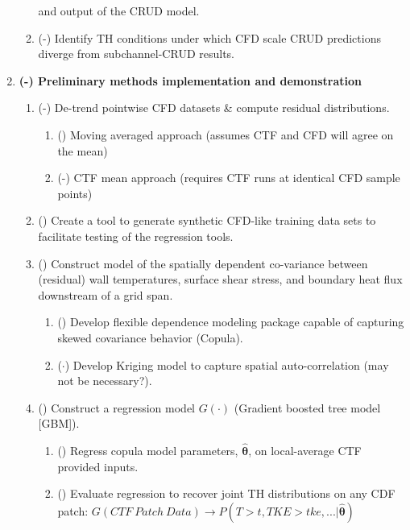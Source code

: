 \begin{enumerate}
\begin{enumerate}
              and output of the CRUD model.
          \item (\checkmark-) Identify TH conditions under which CFD scale CRUD predictions diverge from subchannel-CRUD results.
    \end{enumerate}
\item \textbf{(\checkmark-) Preliminary methods implementation and demonstration}
    \begin{enumerate}
        \item (\checkmark-) De-trend pointwise CFD datasets \& compute residual distributions.
        \begin{enumerate}
            \item (\checkmark) Moving averaged approach (assumes CTF and CFD will agree on the mean)
            \item (\checkmark-) CTF mean approach (requires CTF runs at identical CFD sample points)
        \end{enumerate}
        \item (\checkmark) Create a tool to generate synthetic CFD-like training data sets to facilitate
            testing of the regression tools.
        \item (\checkmark) Construct model of the spatially dependent co-variance between
              (residual) wall temperatures, surface shear stress, and
              boundary heat flux downstream of a grid span.
        \begin{enumerate}
            \item (\checkmark) Develop flexible dependence modeling package capable of capturing skewed covariance behavior (Copula).
            \item ($\cdot$) Develop Kriging model to capture spatial auto-correlation (may not be necessary?).
        \end{enumerate}
        \item (\checkmark) Construct a regression model $G(\cdot)$ (Gradient boosted tree model [GBM]).
        \begin{enumerate}
            \item (\checkmark) Regress copula model parameters, $\bm{\hat\theta}$, on local-average CTF provided inputs.
            \item (\checkmark) Evaluate regression to recover joint TH distributions on any CDF patch:
                $G(CTF\ Patch\ Data) \rightarrow {P(T>t,TKE>tke,...|\bm{\hat\theta})}$
        \end{enumerate}

\end{enumerate}
\end{enumerate}
